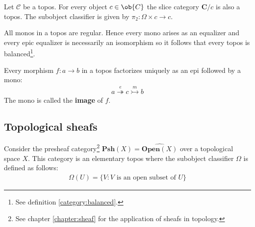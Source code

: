 	\begin{example}
		Let $\mathcal{C}$ be a topos. For every object $c\in\ob{C}$ the slice category $\mathbf{C}/c$ is also a topos. The subobject classifier is given by $\pi_2:\Omega\times c\rightarrow c$.
	\end{example}
	
	\begin{property}[Balanced]
		All monos in a topos are regular. Hence every mono arises as an equalizer and every epic equalizer is necessarily an isomorphism so it follows that every topos is balanced\footnote{See definition \ref{category:balanced}.}.
	\end{property}
	
	\begin{property}
		Every morphism $f:a\rightarrow b$ in a topos factorizes uniquely as an epi followed by a mono:
		\begin{gather}
			a\overset{e}{\twoheadrightarrow} c\overset{m}{\rightarrowtail} b
		\end{gather}
		The mono is called the \textbf{image} of $f$.
	\end{property}

\subsection{Topological sheafs}

	\begin{property}\label{topoi:sheaf_topos}
		Consider the presheaf category\footnote{See chapter \ref{chapter:sheaf} for the application of sheafs in topology.} $\textbf{Psh}(X) = \widehat{\textbf{Open}(X)}$ over a topological space $X$. This category is an elementary topos where the subobject classifier $\Omega$ is defined as follows:
		\begin{gather}
			\Omega(U) = \{V:V\text{ is an open subset of }U\}
		\end{gather}
	\end{property}
	
